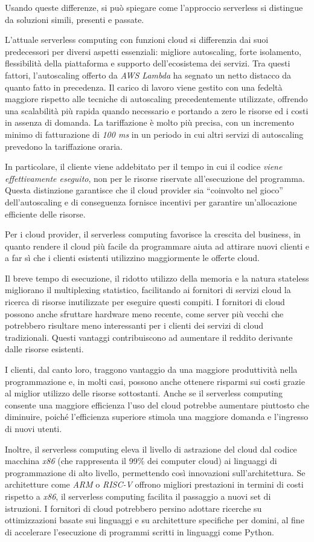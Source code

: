 Usando queste differenze, si può spiegare come l'approccio serverless si distingue da soluzioni simili, presenti e passate.

L'attuale serverless computing con funzioni cloud si differenzia dai suoi predecessori per diversi aspetti essenziali: migliore autoscaling, forte isolamento, flessibilità della piattaforma e supporto dell'ecosistema dei servizi. Tra questi fattori, l'autoscaling offerto da \textit{AWS Lambda} ha segnato un netto distacco da quanto fatto in precedenza. Il carico di lavoro viene gestito con una fedeltà maggiore rispetto alle tecniche di autoscaling precedentemente utilizzate, offrendo una scalabilità più rapida quando necessario e portando a zero le risorse ed i costi in assenza di domanda. La tariffazione è molto più precisa, con un incremento minimo di fatturazione di \textit{100 ms} in un periodo in cui altri servizi di autoscaling prevedono la tariffazione oraria.

In particolare, il cliente viene addebitato per il tempo in cui il codice \textit{viene effettivamente eseguito}, non per le risorse riservate all'esecuzione del programma. Questa distinzione garantisce che il cloud provider sia “coinvolto nel gioco” dell'autoscaling e di conseguenza fornisce incentivi per garantire un'allocazione efficiente delle risorse.

Per i cloud provider, il serverless computing favorisce la crescita del business, in quanto rendere il cloud più facile da programmare aiuta ad attirare nuovi clienti e a far sì che i clienti esistenti utilizzino maggiormente le offerte cloud.

Il breve tempo di esecuzione, il ridotto utilizzo della memoria e la natura stateless migliorano il multiplexing statistico, facilitando ai fornitori di servizi cloud la ricerca di risorse inutilizzate per eseguire questi compiti. I fornitori di cloud possono anche sfruttare hardware meno recente, come server più vecchi che potrebbero risultare meno interessanti per i clienti dei servizi di cloud tradizionali. Questi vantaggi contribuiscono ad aumentare il reddito derivante dalle risorse esistenti.

I clienti, dal canto loro, traggono vantaggio da una maggiore produttività nella programmazione e, in molti casi, possono anche ottenere risparmi sui costi grazie al miglior utilizzo delle risorse sottostanti. Anche se il serverless computing consente una maggiore efficienza l'uso del cloud potrebbe aumentare piuttosto che diminuire, poiché l'efficienza superiore stimola una maggiore domanda e l'ingresso di nuovi utenti.

Inoltre, il serverless computing eleva il livello di astrazione del cloud dal codice macchina \textit{x86} (che rappresenta il 99\% dei computer cloud) ai linguaggi di programmazione di alto livello, permettendo così innovazioni sull'architettura. Se architetture come \textit{ARM} o \textit{RISC-V} offrono migliori prestazioni in termini di costi rispetto a \textit{x86}, il serverless computing facilita il passaggio a nuovi set di istruzioni. I fornitori di cloud potrebbero persino adottare ricerche su ottimizzazioni basate sui linguaggi e su architetture specifiche per domini, al fine di accelerare l'esecuzione di programmi scritti in linguaggi come Python.\cite{jonas2019cloud}